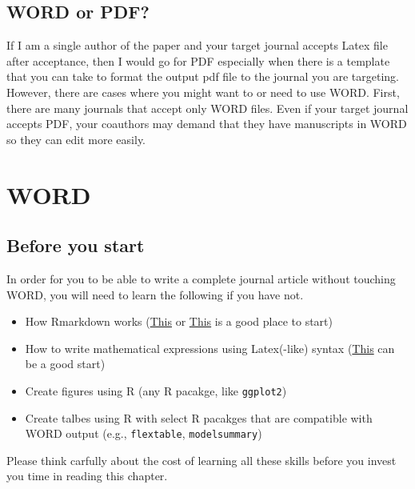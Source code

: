\documentclass[
  letterpaper,
  DIV=11,
  numbers=noendperiod]{scrreprt}
\providecommand{\tightlist}{%
  \setlength{\itemsep}{0pt}\setlength{\parskip}{0pt}}\usepackage{longtable,booktabs,array}
\begin{document}
\hypertarget{word-or-pdf}{%
\section{WORD or PDF?}\label{word-or-pdf}}

If I am a single author of the paper and your target journal accepts
Latex file after acceptance, then I would go for PDF especially when
there is a template that you can take to format the output pdf file to
the journal you are targeting. However, there are cases where you might
want to or need to use WORD. First, there are many journals that accept
only WORD files. Even if your target journal accepts PDF, your coauthors
may demand that they have manuscripts in WORD so they can edit more
easily.


\hypertarget{sec-word}{%
\chapter{WORD}\label{sec-word}}

\hypertarget{before-you-start}{%
\section{Before you start}\label{before-you-start}}

\begin{tcolorbox}[enhanced jigsaw, colframe=quarto-callout-important-color-frame, toptitle=1mm, colbacktitle=quarto-callout-important-color!10!white, toprule=.15mm, colback=white, arc=.35mm, bottomtitle=1mm, opacitybacktitle=0.6, breakable, left=2mm, coltitle=black, leftrule=.75mm, title=\textcolor{quarto-callout-important-color}{\faExclamation}\hspace{0.5em}{What you need to know/learn}, rightrule=.15mm, titlerule=0mm, opacityback=0, bottomrule=.15mm]

In order for you to be able to write a complete journal article without
touching WORD, you will need to learn the following if you have not.

\begin{itemize}
\tightlist
\item
  How Rmarkdown works
  (\href{https://rmarkdown.rstudio.com/lesson-1.html}{This} or
  \href{https://bookdown.org/yihui/rmarkdown/basics.html}{This} is a
  good place to start)
\item
  How to write mathematical expressions using Latex(-like) syntax
  (\href{https://www.overleaf.com/learn/latex/Mathematical_expressions}{This}
  can be a good start)
\item
  Create figures using R (any R pacakge, like \texttt{ggplot2})
\item
  Create talbes using R with select R pacakges that are compatible with
  WORD output (e.g., \texttt{flextable}, \texttt{modelsummary})
\end{itemize}

Please think carfully about the cost of learning all these skills before
you invest you time in reading this chapter.

\end{tcolorbox}
\end{document}
